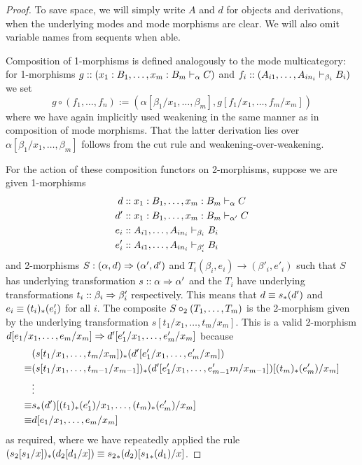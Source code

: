\begin{proof}
To save space, we will simply write $A$ and $d$ for objects and derivations, when the underlying modes and mode morphisms are clear. We will also omit variable names from sequents when able.

Composition of 1-morphisms is defined analogously to the mode multicategory: for 1-morphisms $g :: (x_1 : B_1, \dots, x_m : B_m \vdash_{\alpha} C)$ and $f_i :: (A_{i1}, \dots, A_{in_i} \vdash_{\beta_i} B_i)$ we set \[g \circ (f_1, \dots, f_n) := (\alpha[\beta_1/x_1, \dots, \beta_m], g[f_1/x_1, \dots, f_m/x_m])\] where we have again implicitly used weakening in the same manner as in composition of mode morphisms. That the latter derivation lies over $\alpha[\beta_1/x_1, \dots, \beta_m]$ follows from the cut rule and weakening-over-weakening.

For the action of these composition functors on 2-morphisms, suppose we are given 1-morphisms 
\begin{align*}
d &:: x_1 : B_1, \dots, x_m : B_m \vdash_{\alpha} C \\
d' &:: x_1 : B_1, \dots, x_m : B_m \vdash_{\alpha'} C \\
e_i &:: A_{i1}, \dots, A_{in_i} \vdash_{\beta_i} B_i \\
e'_i &:: A_{i1}, \dots, A_{in_i} \vdash_{\beta'_i} B_i 
\end{align*}
and 2-morphisms $S : (\alpha, d) \Rightarrow (\alpha', d')$ and $T_i (\beta_i, e_i) \to (\beta'_i, e'_i)$ such that $S$ has underlying transformation $s :: \alpha \Rightarrow \alpha'$ and the $T_i$ have underlying transformations $t_i :: \beta_i \Rightarrow \beta'_i$ respectively. This means that $d \equiv s_*(d')$ and $e_i \equiv (t_i)_*(e'_i)$ for all $i$. The composite $S \mathbin{\circ_2} (T_1, \dots, T_m)$ is the 2-morphism given by the underlying transformation $s[t_1/x_1, \dots, t_m/x_m]$. This is a valid 2-morphism $d[e_1/x_1, \dots, e_m/x_m] \Rightarrow d'[e'_1/x_1, \dots, e'_m/x_m]$ because
\begin{align*}
&(s[t_1/x_1, \dots, t_m/x_m])_*(d'[e'_1/x_1, \dots, e'_m/x_m]) \\
\equiv &(s[t_1/x_1, \dots, t_{m-1}/x_{m-1}])_*(d'[e'_1/x_1, \dots, e'_{m-1}m/x_{m-1}])[(t_m)_*(e'_m)/x_m] \\
&\vdots \\
\equiv &s_*(d')[(t_1)_*(e'_1)/x_1, \dots, (t_m)_*(e'_m)/x_m] \\
\equiv &d[e_1/x_1, \dots, e_m/x_m]
\end{align*}
as required, where we have repeatedly applied the rule $(s_2[s_1/x])_*(d_2[d_1/x]) \equiv {s_2}_*(d_2)[{s_1}_*(d_1)/x]$.


\end{proof}
